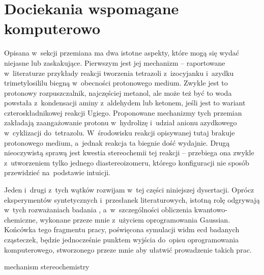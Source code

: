 \chapter{Dociekania wspomagane komputerowo}\label{chapter:numeric}

Opisana w~sekcji \textit{} przemiana ma dwa istotne aspekty,
  które mogą się wydać niejasne lub zaskakujące.
Pierwszym jest jej mechanizm \--- raportowane w~literaturze przykłady reakcji tworzenia tetrazoli
  z~izocyjanku i~azydku trimetylosililu biegną w~obecności protonowego medium.
Zwykle jest to protonowy rozpuszczalnik, najczęściej metanol, ale może też być to woda
  powstała z~kondensacji aminy z~aldehydem lub ketonem, jeśli jest to wariant
  czteroskładnikowej reakcji Ugiego.
Proponowane mechanizmy tych przemian zakładają zaangażowanie protonu w~hydrolizę 
  i~udział anionu azydkowego w~cyklizacji do~tetrazolu.
W~środowisku reakcji opisywanej tutaj brakuje protonowego medium, a~jednak reakcja
  ta biegnie dość wydajnie.
Drugą nieoczywistą sprawą jest kwestia stereochemii tej reakcji \--- przebiega ona zwykle
  z~utworzeniem tylko jednego diastereoizomeru, którego konfiguracji nie sposób przewidzieć
  na~podstawie intuicji.

Jeden i~drugi z~tych wątków rozwijam w~tej części niniejszej dysertacji.
Oprócz eksperymentów syntetycznych i~przesłanek literaturowych, istotną rolę odgrywają w~tych
  rozważaniach badania , a~w~szczególności obliczenia kwantowo-chemiczne,
  wykonane przeze mnie z~użyciem oprogramowania Gaussian.
Końcówka tego fragmentu pracy, poświęcona symulacji widm \gls{ecd} badanych
  cząsteczek, będzie jednocześnie punktem wyjścia do~opisu oprogramowania komputerowego,
  stworzonego przeze mnie aby ułatwić prowadzenie takich prac.

{mechanism}
{stereochemistry}

